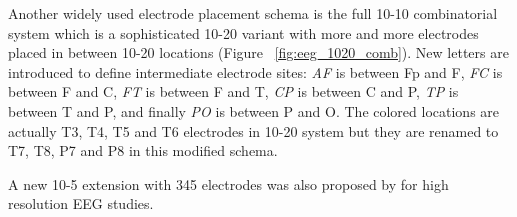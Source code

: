 \documentclass[12pt]{article}
\numberwithin{equation}{section}
\numberwithin{figure}{section}
\numberwithin{table}{section}
\begin{document}
\par{
    Another widely used electrode placement schema is the full 10-10 combinatorial
    system \citeyearpar{guideline_1994} which is a sophisticated 10-20
    variant with more and more electrodes placed in between 10-20 locations
    (Figure ~\ref{fig:eeg_1020_comb}).
    New letters are introduced to define intermediate electrode sites: \emph{AF} is between Fp and F, \emph{FC} is between F and C,
    \emph{FT} is between F and T, \emph{CP} is between C and P, \emph{TP} is between T and P, and finally \emph{PO} is between P and O.
    The colored locations are actually T3, T4, T5 and T6 electrodes in 10-20 system but
    they are renamed to T7, T8, P7 and P8 in this modified schema.
}

\par{
    A new 10-5 extension with 345 electrodes was also proposed by \citet{oostenveld_five_2001} for high resolution EEG studies.
}
\end{document}
